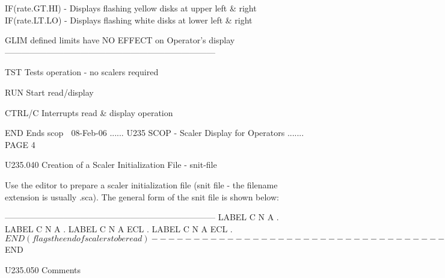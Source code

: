    IF(rate.GT.HI) - Displays flashing yellow disks at upper left & right
   IF(rate.LT.LO) - Displays flashing white  disks at lower left & right
 
   GLIM defined limits have NO EFFECT on Operator's display
   ---------------------------------------------------------------------------
 
   TST              Tests operation - no scalers required
 
   RUN              Start read/display
 
   CTRL/C           Interrupts read & display operation
 
   END              Ends scop
    
   08-Feb-06 ...... U235  SCOP - Scaler Display for Operators ....... PAGE   4
 
 
 
   U235.040  Creation of a Scaler Initialization File - snit-file
 
   Use  the  editor  to  prepare a scaler initialization file (snit file - the
   filename extension is usually .sca). The general form of the snit  file  is
   shown below:
 
   ---------------------------------------------------------------------------
   LABEL C N A
     .
   LABEL C N A
     .
   LABEL C N A ECL
     .
   LABEL C N A ECL
     .
   $END                          (flags the end of scalers to be read)
   ---------------------------------------------------------------------------
   Note: No computed scalers are supported by scop
   ---------------------------------------------------------------------------
 
   LABEL..denotes  a  unique  label  (11 characters max) which must contain no
          imbedded blanks or the characters + - / *
 
   C......denotes the scaler module crate number.
 
   N......denotes the scaler module slot number.
 
   A......denotes the scaler sub-address (numbers start at 0).
 
   ECL....denotes an ECL-scaler (requires special read/clear functions).
 
   ---------------------------------------------------------------------------
 
   Example snit file
 
   Integrator 9 17  2
   Ge.Trigs   9 17  4
   See.Trigs  9 17  5
   $END
 
 
   U235.050  Comments
 
